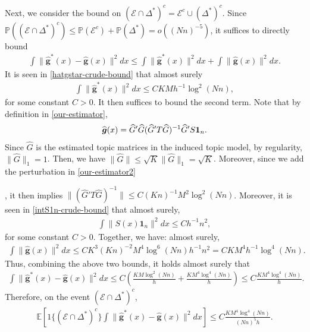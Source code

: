 \documentclass[preprint,11pt]{article}
\newcommand{\mbb}{\mathbb}
\newcommand{\mcal}{\mathcal}
\newcommand{\bg}{{\boldsymbol g}}
\numberwithin{equation}{section}
\begin{document}
Next, we consider the bound on $(\mcal{E}\cap\Delta^*)^c=\mcal{E}^c\cup(\Delta^*)^c$. Since $\mbb{P}((\mcal{E}\cap\Delta^*)^c)\le \mbb{P}(\mcal{E}^c)+\mbb{P}(\Delta^*)=o((Nn)^{-5})$, it suffices to directly bound 
\begin{align*}
    \int \|\bm{\widehat{g}}^*(x)-\widehat{\bm{g}}(x)\|^2dx\le \int \|\bm{\widehat{g}}^*(x)\|^2dx+\int \|\bm{\widehat{g}}(x)\|^2dx.
\end{align*}
It is seen in \eqref{hatgstar-crude-bound} that almost surely
\begin{align*}
    \int\|\bm{\widehat{g}}^*(x)\|^2dx\le CKMh^{-1}\log^2 (Nn),
\end{align*}
for some constant $C>0$. It then suffices to bound the second term. Note that by definition in \eqref{our-estimator},
\begin{align*}
    \widehat{\bg}(x)=\widehat{G}'\widehat{G}(\widehat{G}'T\widehat{G})^{-1}\widehat{G}'S{\bf 1}_n.
\end{align*}
Since $\widehat{G}$ is the estimated topic matrices in the induced topic model, by regularity, $\|\widehat{G}\|_1=1$. Then, we have $\|\widehat{G}\|\le \sqrt{K}\|\widehat{G}\|_1=\sqrt{K}$. Moreover, since we add the perturbation in \eqref{our-estimator2}

, it then implies $\|(\widehat{G}'T\widehat{G})^{-1}\|\le C(Kn)^{-1}M^2\log^2(Nn)$. Moreover, it is seen in \eqref{intS1n-crude-bound} that almost surely,
\begin{align*}
    \int \|S(x)\bm{1}_n\|^2dx\le Ch^{-1}n^2,
\end{align*}
for some constant $C>0$. Together, we have: almost surely,
\begin{align*}
    \int \|\bm{\widehat{g}}(x)\|^2dx\le CK^3(Kn)^{-2}M^4\log^6(Nn)h^{-1}n^2 = CKM^4h^{-1}\log^4(Nn).
\end{align*}
Thus, combining the above two bounds, it holds almost surely that
\begin{align*}
    \int \|\bm{\widehat{g}}^*(x)-\widehat{\bm{g}}(x)\|^2dx\le C\left(\frac{KM\log^2(Nn)}{h}+\frac{KM^4\log^4(Nn)}{h}\right)\le C\frac{KM^4\log^4(Nn)}{h}.
\end{align*}
Therefore, on the event $(\mcal{E}\cap \Delta^*)^c$,
\begin{align*}
    \mbb{E}\left[1\{(\mcal{E}\cap\Delta^*)^c\}\int \|\bm{\widehat{g}}^*(x)-\widehat{\bm{g}}(x)\|^2dx\right]\le C\frac{KM^4\log^4(Nn)}{(Nn)^5h}.
\end{align*}
\end{document}
